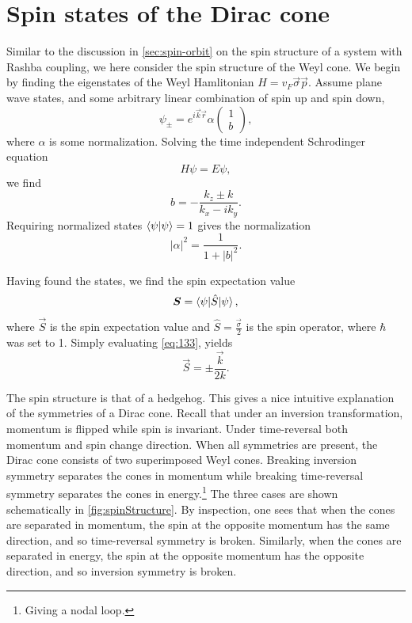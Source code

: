 \section{Spin states of the Dirac cone}
Similar to the discussion in \cref{sec:spin-orbit} on the spin structure of a system with Rashba coupling, we here consider the spin structure of the Weyl cone.
We begin by finding the eigenstates of the Weyl Hamlitonian \( H = v_F \vec{\sigma} \vec{p} \).
Assume plane wave states, and some arbitrary linear combination of spin up and spin down,
\[
  \psi _{\pm} = e^{i \vec{k} \vec{r}} \alpha
  \begin{pmatrix}
    1\\
    b
  \end{pmatrix},
\]
where \(\alpha \) is some normalization.
Solving the time independent Schrodinger equation
\[
H \psi = E \psi,
\]
we find
\begin{equation}
  \label{eq:132}
  b = -\frac{k_{z} \pm k}{k_{x} - i k_{y}}.
\end{equation}
Requiring normalized states \(\braket{\psi | \psi } = 1\) gives the normalization
\[
|\alpha |^2 = \frac{1}{1 + |b|^2}.
\]

Having found the states, we find the spin expectation value
\begin{equation}
  \label{eq:133}
  \bm{S} = \braket{\psi | \hat{S} | \psi },
\end{equation}
where \(\vec{S}\) is the spin expectation value and \(\hat{S} = \frac{\vec{\sigma}}{2} \) is the spin operator, where \(\hbar \) was set to 1.
Simply evaluating \cref{eq:133}, yields
\begin{equation}
  \label{eq:134}
  \vec{S} = \pm \frac{\vec{k}}{2 k}.
\end{equation}

The spin structure is that of a hedgehog.
This gives a nice intuitive explanation of the symmetries of a Dirac cone.
Recall that under an inversion transformation, momentum is flipped while spin is invariant.
Under time-reversal both momentum and spin change direction.
When all symmetries are present, the Dirac cone consists of two superimposed Weyl cones.
Breaking inversion symmetry separates the cones in momentum while breaking time-reversal symmetry separates the cones in energy.\footnote{Giving a nodal loop.}
The three cases are shown schematically in \cref{fig:spinStructure}.
By inspection, one sees that when the cones are separated in momentum, the spin at the opposite momentum has the same direction, and so time-reversal symmetry is broken.
Similarly, when the cones are separated in energy, the spin at the opposite momentum has the opposite direction, and so inversion symmetry is broken.


